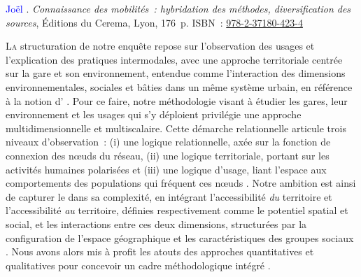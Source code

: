 \begin{refsegment}
\begin{displayquote}
\textcolor{blue}{Joël} \textcolor{blue}{\textcite[12-14, 160]{meissonnier_connaissance_2020}}. \textsl{Connaissance des mobilités~: hybridation des méthodes, diversification des sources}, Éditions du Cerema, Lyon, 176~p. ISBN~: \href{https://search.worldcat.org/fr/title/1236011015}{978-2-37180-423-4}
    \end{displayquote}

\lettrine[lines=3, findent=8pt, nindent=0pt]{ L}{a} structuration de notre enquête repose sur l’observation des usages et l’explication des pratiques intermodales, avec une approche territoriale centrée sur la gare et son environnement, entendue comme l'interaction des dimensions environnementales, sociales et bâties dans un même système urbain, en référence à la notion d' \textcolor{blue}{\autocite[7]{moretti_interconnexion_1999}}. Pour ce faire, notre méthodologie visant à étudier les gares, leur environnement et les usages qui s'y déploient privilégie une approche multidimensionnelle et multiscalaire. Cette démarche relationnelle articule trois niveaux d’observation~: (i) une logique relationnelle, axée sur la fonction de connexion des nœuds du réseau, (ii) une logique territoriale, portant sur les activités humaines polarisées et (iii) une logique d'usage, liant l'espace aux comportements des populations qui fréquent ces nœuds \textcolor{blue}{\autocites[9]{moretti_interconnexion_1999}[210-212]{menerault_gares_2001}}. Notre ambition est ainsi de capturer le  dans sa complexité, en intégrant l’\gls{accessibilité} \textsl{du} territoire et l’accessibilité \textsl{au} territoire, définies respectivement comme le potentiel spatial et social, et les interactions entre ces deux dimensions, structurées par la configuration de l'espace géographique et les caractéristiques des groupes sociaux \textcolor{blue}{\autocite[6]{richer_mesurer_2012}}. Nous avons alors mis à profit les atouts des approches quantitatives et qualitatives pour concevoir un cadre méthodologique intégré \textcolor{blue}{\autocite[]{bergman_advances_2008}}.%


\end{refsegment}
